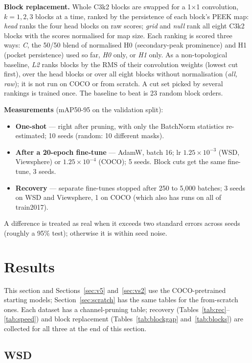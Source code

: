 \documentclass[10pt]{article}
\begin{document}
\textbf{Block replacement.} Whole C3k2 blocks are swapped for a 1$\times$1 convolution, $k = 1, 2, 3$
blocks at a time, ranked by the persistence of each block's PEEK map: \emph{head} ranks the four
head blocks on raw scores; \emph{grid} and \emph{null} rank all eight C3k2 blocks with the scores
normalised for map size. Each ranking is scored three ways: \emph{C}, the 50/50 blend of
normalised H0 (secondary-peak prominence) and H1 (pocket persistence) used so far, \emph{H0} only,
or \emph{H1} only. As a non-topological baseline, \emph{L2} ranks blocks by the RMS of their
convolution weights (lowest cut first), over the head blocks or over all eight blocks without
normalisation (\emph{all, raw}); it is not run on COCO or from scratch. A cut set picked by several rankings is trained
once. The baseline to beat is 23 random block orders.

\textbf{Measurements} (mAP50-95 on the validation split):
\begin{itemize}
\item \textbf{One-shot} --- right after pruning, with only the BatchNorm statistics re-estimated;
  10 seeds (random: 10 different masks).
\item \textbf{After a 20-epoch fine-tune} --- AdamW, batch 16; lr $1.25\times10^{-3}$ (WSD,
  Viewsphere) or $1.25\times10^{-4}$ (COCO); 5 seeds. Block cuts get the same fine-tune, 3 seeds.
\item \textbf{Recovery} --- separate fine-tunes stopped after 250 to 5,000 batches; 3 seeds on WSD
  and Viewsphere, 1 on COCO (which also has runs on all of train2017).
\end{itemize}
A difference is treated as real when it exceeds two standard errors across seeds (roughly a 95\%
test); otherwise it is within seed noise.

\section{Results}

This section and Sections~\ref{sec:v5} and~\ref{sec:vs2} use the COCO-pretrained starting models;
Section~\ref{sec:scratch} has the same tables for the from-scratch ones. Each dataset has a
channel-pruning table; recovery (Tables~\ref{tab:rec}--\ref{tab:speed}) and
block replacement (Tables~\ref{tab:blockgap} and~\ref{tab:blocks}) are collected for all three at
the end of this section.

\subsection{WSD}
\end{document}
